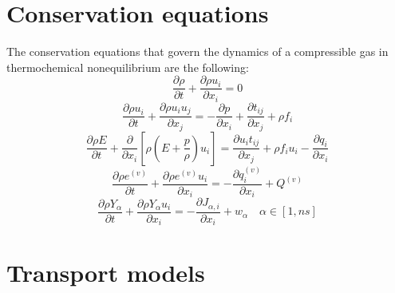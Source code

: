\documentclass[oneside,a4paper,11pt]{report}
\begin{document}
\section{Conservation equations}
The conservation equations that govern the dynamics of a compressible gas in thermochemical nonequilibrium are the following:
\begin{equation}
\frac{\partial \rho}{\partial t} + \frac{\partial \rho u_i}{\partial x_i} = 0
\end{equation}
\begin{equation}
\frac{\partial \rho u_i}{\partial t} + \frac{\partial \rho u_i u_j}{\partial x_j} = - \frac{\partial p}{\partial x_i} + \frac{\partial t_{ij}}{\partial x_j} + \rho f_i
\end{equation}
\begin{equation}
\frac{\partial \rho E}{\partial t} + \frac{\partial}{\partial x_i} \left [ \rho \left ( E + \frac{p}{\rho} \right ) u_i \right ] = \frac{\partial u_i t_{ij}}{\partial x_j} + \rho f_i u_i -  \frac{\partial q_i}{\partial x_i}
\end{equation}
\begin{equation}
\frac{\partial \rho e^{(v)}}{\partial t} + \frac{\partial \rho e^{(v)} u_i}{\partial x_i}  = -  \frac{\partial q_i^{(v)}}{\partial x_i} + Q^{(v)}
\end{equation}
\begin{equation}
\frac{\partial\rho Y_\alpha}{\partial t}+\frac{\partial \rho Y_\alpha u_i}{\partial x_i} = -\frac{\partial J_{\alpha,i}}{\partial x_i} + w_\alpha \quad \alpha \in [1,ns]
\end{equation}

\section{Transport models}

\end{document}
